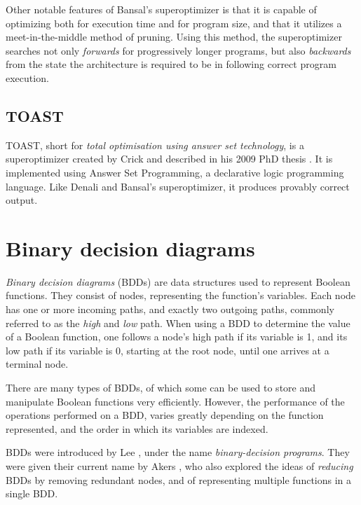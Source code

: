 \documentclass[a4paper,11pt]{kth-mag}
\begin{document}

Other notable features of Bansal's superoptimizer is that it is capable of optimizing both for execution time and for program size, and that it utilizes a meet-in-the-middle method of pruning.
Using this method, the superoptimizer searches not only \emph{forwards} for progressively longer programs, but also \emph{backwards} from the state the architecture is required to be in following correct program execution.

\subsection{TOAST}

TOAST, short for \emph{total optimisation using answer set technology}, is a superoptimizer created by Crick and described in his 2009 PhD thesis \cite{crick_thesis}.
It is implemented using Answer Set Programming, a declarative logic programming language.
Like Denali and Bansal's superoptimizer, it produces provably correct output.

%

\section{Binary decision diagrams}
\label{s:bdds}

\emph{Binary decision diagrams} (BDDs) are data structures used to represent Boolean functions.
They consist of nodes, representing the function's variables. Each node has one or more incoming paths, and exactly two outgoing paths, commonly referred to as the \emph{high} and \emph{low} path.
When using a BDD to determine the value of a Boolean function, one follows a node's high path if its variable is 1, and its low path if its variable is 0, starting at the root node, until one arrives at a terminal node.

There are many types of BDDs, of which some can be used to store and manipulate Boolean functions very efficiently.
However, the performance of the operations performed on a BDD, varies greatly depending on the function represented, and the order in which its variables are indexed.

BDDs were introduced by Lee \cite{lee59}, under the name \emph{binary-decision programs}.
They were given their current name by Akers \cite{akers78}, who also explored the ideas of \emph{reducing} BDDs by removing redundant nodes, and of representing multiple functions in a single BDD.
\end{document}
